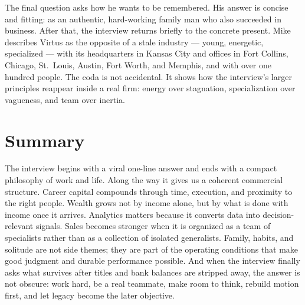 The final question asks how he wants to be remembered. His answer is concise and fitting: as an authentic, hard-working family man who also succeeded in business. After that, the interview returns briefly to the concrete present. Mike describes Virtus as the opposite of a stale industry --- young, energetic, specialized --- with its headquarters in Kansas City and offices in Fort Collins, Chicago, St.~Louis, Austin, Fort Worth, and Memphis, and with over one hundred people. The coda is not accidental. It shows how the interview's larger principles reappear inside a real firm: energy over stagnation, specialization over vagueness, and team over inertia.

\section{Summary}

The interview begins with a viral one-line answer and ends with a compact philosophy of work and life. Along the way it gives us a coherent commercial structure. Career capital compounds through time, execution, and proximity to the right people. Wealth grows not by income alone, but by what is done with income once it arrives. Analytics matters because it converts data into decision-relevant signals. Sales becomes stronger when it is organized as a team of specialists rather than as a collection of isolated generalists. Family, habits, and solitude are not side themes; they are part of the operating conditions that make good judgment and durable performance possible. And when the interview finally asks what survives after titles and bank balances are stripped away, the answer is not obscure: work hard, be a real teammate, make room to think, rebuild motion first, and let legacy become the later objective.